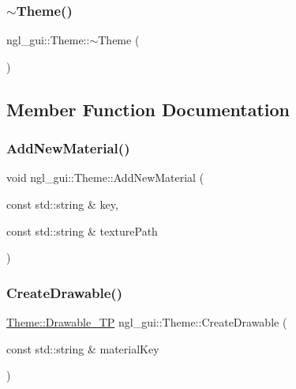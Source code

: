 \mbox{\label{classngl__gui_1_1_theme_a7663964103c6d039cc8e6b49259667b9}} 
\subsubsection{\texorpdfstring{$\sim$\+Theme()}{~Theme()}}
{\footnotesize\ttfamily ngl\+\_\+gui\+::\+Theme\+::$\sim$\+Theme (\begin{DoxyParamCaption}{ }\end{DoxyParamCaption})\hspace{0.3cm}{\ttfamily [virtual]}}



\subsection{Member Function Documentation}
\mbox{\label{classngl__gui_1_1_theme_a6b46d8c368e7112e64e5ff764766b9f0}} 
\subsubsection{\texorpdfstring{Add\+New\+Material()}{AddNewMaterial()}}
{\footnotesize\ttfamily void ngl\+\_\+gui\+::\+Theme\+::\+Add\+New\+Material (\begin{DoxyParamCaption}\item[{const std\+::string \&}]{key,  }\item[{const std\+::string \&}]{texture\+Path }\end{DoxyParamCaption})\hspace{0.3cm}{\ttfamily [protected]}}

\mbox{\label{classngl__gui_1_1_theme_a6a425e30c7a2183edc9155f7821bec63}} 
\subsubsection{\texorpdfstring{Create\+Drawable()}{CreateDrawable()}}
{\footnotesize\ttfamily \mbox{\hyperlink{classngl__gui_1_1_theme_a43741a39898ef4b14443b980a2e6d67c}{Theme\+::\+Drawable\+\_\+\+TP}} ngl\+\_\+gui\+::\+Theme\+::\+Create\+Drawable (\begin{DoxyParamCaption}\item[{const std\+::string \&}]{material\+Key }\end{DoxyParamCaption})\hspace{0.3cm}{\ttfamily [protected]}}



